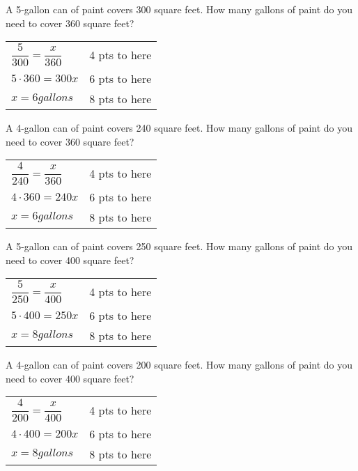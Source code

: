 {
	A 5-gallon can of paint covers 300 square feet. How many gallons of paint do you need to cover 360 square feet?
}
{
	\begin{tabular}{l r}
	$\dfrac{5}{300}=\dfrac{x}{360}$ & 4 pts to here\\
	$5\cdot 360=300x$ & 6 pts to here\\
	$x=6 gallons$ & 8 pts to here\\
	\end{tabular}
}

{
	A 4-gallon can of paint covers 240 square feet. How many gallons of paint do you need to cover 360 square feet?
}
{
	\begin{tabular}{l r}
	$\dfrac{4}{240}=\dfrac{x}{360}$ & 4 pts to here\\
	$4\cdot 360=240x$ & 6 pts to here\\
	$x=6 gallons$ & 8 pts to here\\
	\end{tabular}
}

{
	A 5-gallon can of paint covers 250 square feet. How many gallons of paint do you need to cover 400 square feet?
}
{
	\begin{tabular}{l r}
	$\dfrac{5}{250}=\dfrac{x}{400}$ & 4 pts to here\\
	$5\cdot 400=250x$ & 6 pts to here\\
	$x=8 gallons$ & 8 pts to here\\
	\end{tabular}
}

{
	A 4-gallon can of paint covers 200 square feet. How many gallons of paint do you need to cover 400 square feet?
}
{
	\begin{tabular}{l r}
	$\dfrac{4}{200}=\dfrac{x}{400}$ & 4 pts to here\\
	$4\cdot 400=200x$ & 6 pts to here\\
	$x=8 gallons$ & 8 pts to here\\
	\end{tabular}
}
